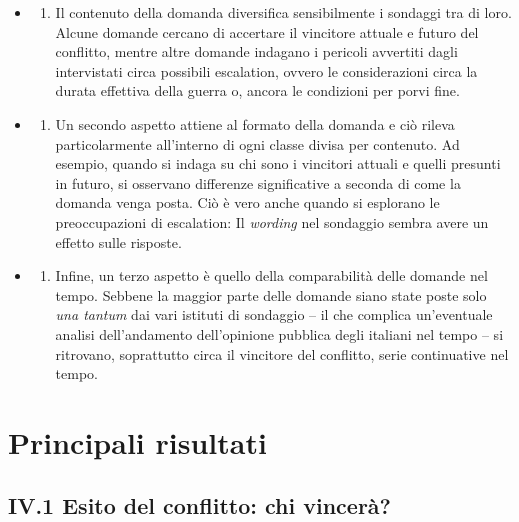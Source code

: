 \documentclass[
  openany]{book}
\providecommand{\tightlist}{%
  \setlength{\itemsep}{0pt}\setlength{\parskip}{0pt}}
\begin{document}
\begin{itemize}
\item
  \begin{enumerate}
  \def\labelenumi{\alph{enumi})}
  \tightlist
  \item
    Il contenuto della domanda diversifica sensibilmente i sondaggi tra di loro. Alcune domande cercano di accertare il vincitore attuale e futuro del conflitto, mentre altre domande indagano i pericoli avvertiti dagli intervistati circa possibili escalation, ovvero le considerazioni circa la durata effettiva della guerra o, ancora le condizioni per porvi fine.
  \end{enumerate}
\item
  \begin{enumerate}
  \def\labelenumi{\alph{enumi})}
  \setcounter{enumi}{1}
  \tightlist
  \item
    Un secondo aspetto attiene al formato della domanda e ciò rileva particolarmente all'interno di ogni classe divisa per contenuto. Ad esempio, quando si indaga su chi sono i vincitori attuali e quelli presunti in futuro, si osservano differenze significative a seconda di come la domanda venga posta. Ciò è vero anche quando si esplorano le preoccupazioni di escalation: Il \emph{wording} nel sondaggio sembra avere un effetto sulle risposte.
  \end{enumerate}
\item
  \begin{enumerate}
  \def\labelenumi{\alph{enumi})}
  \setcounter{enumi}{2}
  \tightlist
  \item
    Infine, un terzo aspetto è quello della comparabilità delle domande nel tempo. Sebbene la maggior parte delle domande siano state poste solo \emph{una tantum} dai vari istituti di sondaggio -- il che complica un'eventuale analisi dell'andamento dell'opinione pubblica degli italiani nel tempo -- si ritrovano, soprattutto circa il vincitore del conflitto, serie continuative nel tempo.
  \end{enumerate}
\end{itemize}

\hypertarget{principali-risultati-2}{%
\section{Principali risultati}\label{principali-risultati-2}}

\hypertarget{iv.1-esito-del-conflitto-chi-vinceruxe0}{%
\subsection{IV.1 Esito del conflitto: chi vincerà?}\label{iv.1-esito-del-conflitto-chi-vinceruxe0}}
\end{document}
